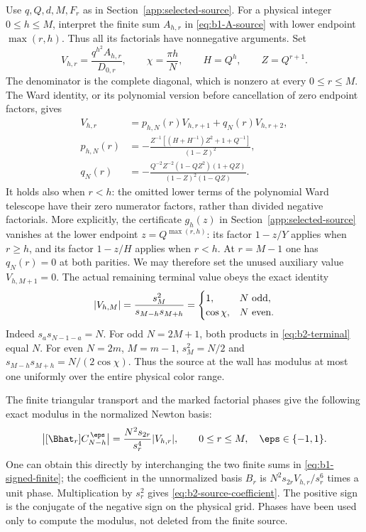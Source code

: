 Use $q,Q,d,M,F_r$ as in Section~\ref{app:selected-source}. For a physical
integer $0\le h\le M$, interpret the finite sum $A_{h,r}$ in
\eqref{eq:b1-A-source} with lower endpoint $\max(r,h)$. Thus all its
factorials have nonnegative arguments. Set
\[
 V_{h,r}=\frac{q^{h^2}A_{h,r}}{D_{0,r}},\qquad
 \chi=\frac{\pi h}{N},\qquad H=Q^h,\qquad Z=Q^{r+1}.
\]
The denominator is the complete diagonal, which is nonzero at every
$0\le r\le M$. The Ward identity, or its polynomial version before
cancellation of zero endpoint factors, gives
\begin{equation}\label{eq:b2-global-recurrence}
\begin{aligned}
 V_{h,r}&=p_{h,N}(r)V_{h,r+1}+q_N(r)V_{h,r+2},\\
 p_{h,N}(r)
 &=-\frac{Z^{-1}[(H+H^{-1})Z^2+1+Q^{-1}]}{(1-Z)^2},\\
 q_N(r)
 &=-\frac{Q^{-2}Z^{-2}(1-QZ^2)(1+QZ)}
 {(1-Z)^2(1-QZ)} .
\end{aligned}
\end{equation}
It holds also when $r<h$: the omitted lower terms of the polynomial
Ward telescope have their zero numerator factors, rather than divided
negative factorials. More explicitly, the certificate
$g_h(z)$ in Section~\ref{app:selected-source} vanishes at the lower
endpoint $z=Q^{\max(r,h)}$: its factor $1-z/Y$ applies when $r\ge h$,
and its factor $1-z/H$ applies when $r<h$.
At $r=M-1$ one has $q_N(r)=0$ at both parities.
We may therefore set the unused auxiliary value $V_{h,M+1}=0$.
The actual remaining terminal value obeys the exact identity
\begin{equation}\label{eq:b2-terminal}
 |V_{h,M}|=\frac{s_M^2}{s_{M-h}s_{M+h}}
 =\begin{cases}
 1,&N\ \hbox{odd},\\
 \cos\chi,&N\ \hbox{even}.
 \end{cases}
\end{equation}
Indeed $s_a s_{N-1-a}=N$. For odd $N=2M+1$, both products in
\eqref{eq:b2-terminal} equal $N$. For even $N=2m$, $M=m-1$,
$s_M^2=N/2$ and
$s_{M-h}s_{M+h}=N/(2\cos\chi)$. Thus the source at the wall has
modulus at most one uniformly over the entire physical color range.

The finite triangular transport and the marked factorial phases give
the following exact modulus in the normalized Newton basis:
\begin{equation}\label{eq:b2-source-coefficient}
 \bigl|[\Bhat_r]C_{N-h}^{\,\eps}\bigr|
   =\frac{N^2s_{2r}}{s_r^4}|V_{h,r}|,\qquad
 0\le r\le M,\quad \eps\in\{-1,1\}.
\end{equation}
One can obtain this directly by interchanging the two finite sums in
\eqref{eq:b1-signed-finite}; the coefficient in the unnormalized basis
$B_r$ is $N^2s_{2r}V_{h,r}/s_r^6$ times a unit phase.
Multiplication by $s_r^2$ gives \eqref{eq:b2-source-coefficient}.
The positive sign is the conjugate of the negative sign on the
physical grid. Phases have been used only to compute the modulus,
not deleted from the finite source.

